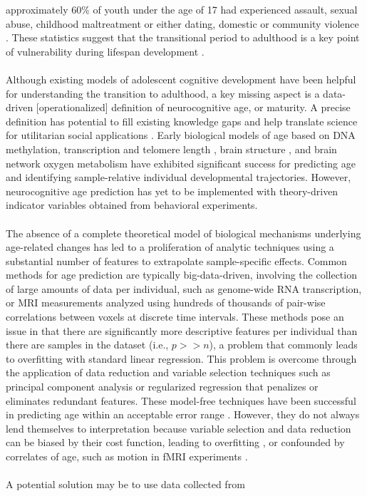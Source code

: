 \documentclass[utf8]{frontiersSCNS} %
\begin{document}
approximately 60\% of youth under the age of 17 had experienced assault, sexual abuse, childhood maltreatment or either dating, domestic or community violence \citep{finkelhor2009children}.  These statistics suggest that the transitional period to adulthood is a key point of vulnerability during lifespan development \citep*{berzin2010vulnerability}. \paragraph*{} Although existing models of adolescent cognitive development have been helpful for understanding the transition to adulthood, a key missing aspect is a data-driven [operationalized] definition of neurocognitive age, or maturity. A precise definition has potential to fill existing knowledge gaps and help translate science for utilitarian social applications  \citep{somerville2016searching}. Early biological models of age based on DNA methylation, transcription and telomere length \citep{baker1988biomarkers, jylhava2017biological}, brain structure \citep{khundrakpam2015prediction,aycheh2018biological,madan2018predicting}, and brain network oxygen metabolism \citep{dosenbach2010prediction, qin2015predicting} have exhibited significant success for predicting age and identifying sample-relative individual developmental trajectories. However, neurocognitive age prediction has yet to be implemented with theory-driven indicator variables obtained from behavioral experiments. \paragraph*{} The absence of a complete theoretical model of biological mechanisms underlying age-related changes has led to a proliferation of analytic techniques using a substantial number of features to extrapolate sample-specific effects. Common methods for age prediction are typically big-data-driven, involving the collection of large amounts of data per individual, such as genome-wide RNA transcription, or MRI measurements analyzed using hundreds of thousands of pair-wise correlations between voxels at discrete time intervals. These methods pose an issue in that there are significantly more descriptive features per individual than there are samples in the dataset (i.e., $p >> n$), a problem that commonly leads to overfitting with standard linear regression. This problem is overcome through the application of data reduction and variable selection techniques such as principal component analysis or regularized regression that penalizes or eliminates redundant features. These model-free techniques have been successful in predicting age within an acceptable error range \citep{cole2017predicting}. However, they do not always lend themselves to interpretation because variable selection and data reduction can be biased by their cost function, leading to overfitting \citep{babyak2004you}, or confounded by correlates of age, such as motion in fMRI experiments \citep{satterthwaite2013heterogeneous}. \paragraph*{} A potential solution may be to use data collected from 
\end{document}
